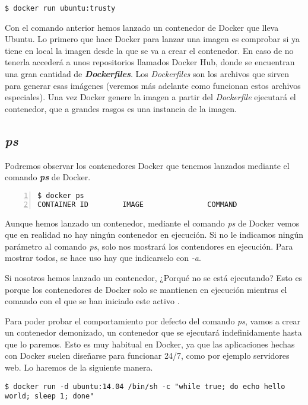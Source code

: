 	\begin{lstlisting}[style=consola]
$ docker run ubuntu:trusty
	\end{lstlisting}
	
	Con el comando anterior hemos lanzado un contenedor de Docker que lleva Ubuntu. Lo primero que hace Docker para lanzar una imagen es comprobar si ya tiene en local la imagen desde la que se va a crear el contenedor. En caso de no tenerla accederá a unos repositorios llamados Docker Hub, donde se encuentran una gran cantidad de \textbf{\emph{Dockerfiles}}. Los \emph{Dockerfiles} son los archivos que sirven para generar esas imágenes (veremos más adelante como funcionan estos archivos especiales). Una vez Docker genere la imagen a partir del \textit{Dockerfile} ejecutará el contenedor, que a grandes rasgos es una instancia de la imagen.
	
	\subsection{\textit{ps}}
	Podremos observar los contenedores Docker que tenemos lanzados mediante el comando \textbf{\emph{ps}} de Docker.
	
	\begin{lstlisting}[style=consola,numbers=left]
$ docker ps
CONTAINER ID        IMAGE               COMMAND                  CREATED             STATUS              PORTS               NAMES
	\end{lstlisting}
	
	Aunque hemos lanzado un contenedor, mediante el comando \emph{ps} de Docker vemos que en realidad no hay ningún contenedor en ejecución. Si no le indicamos ningún parámetro al comando \emph{ps}, solo nos mostrará los contendores en ejecución. Para mostrar todos, se hace uso hay que indicarselo con \emph{-a}.
	
	Si nosotros hemos lanzado un contenedor, ¿Porqué no se está ejecutando? Esto es porque los contenedores de Docker solo se mantienen en ejecución mientras el comando con el que se han iniciado este activo \cite{docker-run}.
	
	Para poder probar el comportamiento por defecto del comando \emph{ps}, vamos a crear un contenedor demonizado, un contenedor que se ejecutará indefinidamente hasta que lo paremos. Esto es muy habitual en Docker, ya que las aplicaciones hechas con Docker suelen diseñarse para funcionar 24/7, como por ejemplo servidores web. Lo haremos de la siguiente manera.
	
	\begin{lstlisting}[style=consola]
$ docker run -d ubuntu:14.04 /bin/sh -c "while true; do echo hello world; sleep 1; done"
	\end{lstlisting}
	
